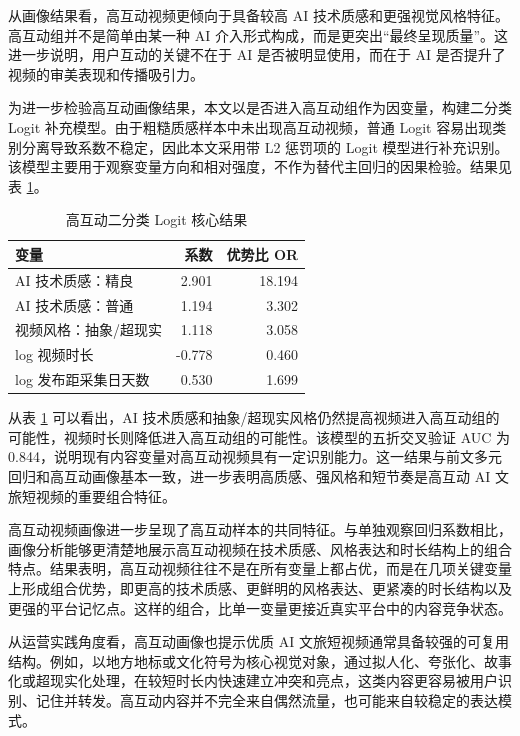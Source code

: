 从画像结果看，高互动视频更倾向于具备较高 AI 技术质感和更强视觉风格特征。高互动组并不是简单由某一种 AI 介入形式构成，而是更突出“最终呈现质量”。这进一步说明，用户互动的关键不在于 AI 是否被明显使用，而在于 AI 是否提升了视频的审美表现和传播吸引力。

为进一步检验高互动画像结果，本文以是否进入高互动组作为因变量，构建二分类 Logit 补充模型。由于粗糙质感样本中未出现高互动视频，普通 Logit 容易出现类别分离导致系数不稳定，因此本文采用带 L2 惩罚项的 Logit 模型进行补充识别。该模型主要用于观察变量方向和相对强度，不作为替代主回归的因果检验。结果见表 \ref{tab:logit}。

\begin{table}[!htbp]
  \centering
  \caption{高互动二分类 Logit 核心结果}
  \label{tab:logit}
  \begin{tabular}{lrr}
    \toprule
    变量 & 系数 & 优势比 OR \\
    \midrule
    AI 技术质感：精良 & 2.901 & 18.194 \\
    AI 技术质感：普通 & 1.194 & 3.302 \\
    视频风格：抽象/超现实 & 1.118 & 3.058 \\
    log 视频时长 & -0.778 & 0.460 \\
    log 发布距采集日天数 & 0.530 & 1.699 \\
    \bottomrule
  \end{tabular}
\end{table}

从表 \ref{tab:logit} 可以看出，AI 技术质感和抽象/超现实风格仍然提高视频进入高互动组的可能性，视频时长则降低进入高互动组的可能性。该模型的五折交叉验证 AUC 为 0.844，说明现有内容变量对高互动视频具有一定识别能力。这一结果与前文多元回归和高互动画像基本一致，进一步表明高质感、强风格和短节奏是高互动 AI 文旅短视频的重要组合特征。

高互动视频画像进一步呈现了高互动样本的共同特征。与单独观察回归系数相比，画像分析能够更清楚地展示高互动视频在技术质感、风格表达和时长结构上的组合特点。结果表明，高互动视频往往不是在所有变量上都占优，而是在几项关键变量上形成组合优势，即更高的技术质感、更鲜明的风格表达、更紧凑的时长结构以及更强的平台记忆点。这样的组合，比单一变量更接近真实平台中的内容竞争状态。

从运营实践角度看，高互动画像也提示优质 AI 文旅短视频通常具备较强的可复用结构。例如，以地方地标或文化符号为核心视觉对象，通过拟人化、夸张化、故事化或超现实化处理，在较短时长内快速建立冲突和亮点，这类内容更容易被用户识别、记住并转发。高互动内容并不完全来自偶然流量，也可能来自较稳定的表达模式。

